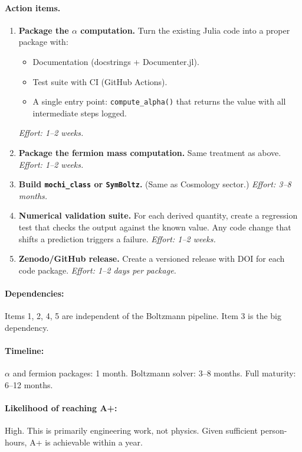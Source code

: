 \documentclass[11pt,a4paper]{article}
\begin{document}
\paragraph{Action items.}
\begin{enumerate}
    \item \textbf{Package the $\alpha$ computation.} Turn the existing Julia code into a proper package with:
    \begin{itemize}
        \item Documentation (docstrings + Documenter.jl).
        \item Test suite with CI (GitHub Actions).
        \item A single entry point: \texttt{compute\_alpha()} that returns the value with all intermediate steps logged.
    \end{itemize}
    \emph{Effort: 1--2 weeks.}
    \item \textbf{Package the fermion mass computation.} Same treatment as above. \emph{Effort: 1--2 weeks.}
    \item \textbf{Build \texttt{mochi\_class} or \texttt{SymBoltz}.} (Same as Cosmology sector.) \emph{Effort: 3--8 months.}
    \item \textbf{Numerical validation suite.} For each derived quantity, create a regression test that checks the output against the known value. Any code change that shifts a prediction triggers a failure. \emph{Effort: 1--2 weeks.}
    \item \textbf{Zenodo/GitHub release.} Create a versioned release with DOI for each code package. \emph{Effort: 1--2 days per package.}
\end{enumerate}

\paragraph{Dependencies:} Items 1, 2, 4, 5 are independent of the Boltzmann pipeline. Item 3 is the big dependency.

\paragraph{Timeline:} $\alpha$ and fermion packages: 1 month. Boltzmann solver: 3--8 months. Full maturity: 6--12 months.

\paragraph{Likelihood of reaching A+:} \textcolor{gradeA}{High}. This is primarily engineering work, not physics. Given sufficient person-hours, A+ is achievable within a year.
\end{document}
